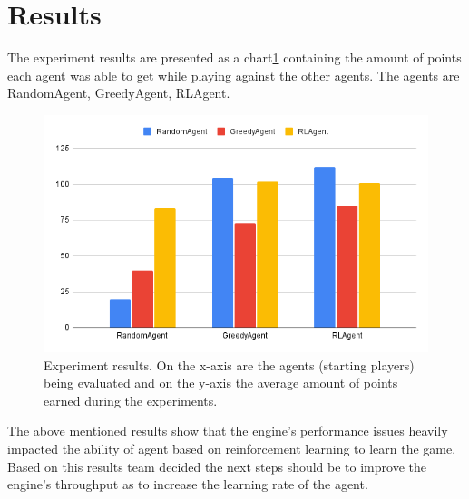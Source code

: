 \section{Results}

The experiment results are presented as a chart\ref{fig:Results} containing the amount of 
points each agent was able to get while playing against the other agents. The agents are
RandomAgent, GreedyAgent, RLAgent.

\begin{figure}[h]
	\includegraphics[width=\linewidth]{figures/chart}
	\caption{Experiment results. On the x-axis are the agents (starting players) being evaluated and on the y-axis the average amount of points earned during the experiments.}
	\label{fig:Results}
\end{figure}

The above mentioned results show that the engine's performance issues heavily
impacted the ability of agent based on reinforcement learning to learn the game.
Based on this results team decided the next steps should be to improve the engine's
throughput as to increase the learning rate of the agent.
